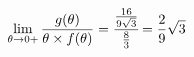 \documentclass[preview]{standalone}
\begin{document}
\begin{align*}
\lim_{\theta \to 0 +} {g( \theta ) \over {\theta \times f( \theta )}} = \cfrac{\frac{16}{9\sqrt{3}}}{\frac{8}{3}} = \frac{2}{9}\sqrt{3}
\end{align*}
\end{document}
